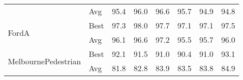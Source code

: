 \begin{table}[t]
\begin{tabular}{llcccccc}
                                       & Avg  & 95.4&	96.0&	96.6&	95.7&	94.9&	94.8\\
         \multirow{2}{*}{FordA} & Best & 97.3&	98.0&	97.7&	97.1&	97.1&	97.5\\
                                   & Avg  & 96.1&	96.6&	97.2&	95.5&	95.7&	96.0\\
         \multirow{2}{*}{MelbournePedestrian} & Best & 92.1&	91.5&	91.0&	90.4&	91.0&	93.1\\
                                       & Avg  & 81.8&	82.8&	83.9&	83.5&	83.8&	84.9\\
         \bottomrule
    \end{tabular}
\end{table}